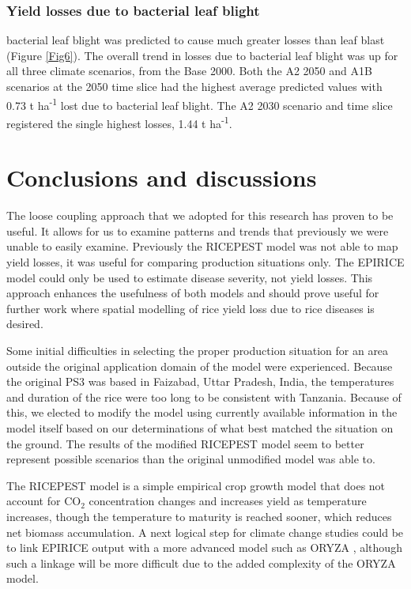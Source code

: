     \subsubsection{Yield losses due to bacterial leaf blight}
    \label{bb_yield_losses}
    bacterial leaf blight was predicted to cause much greater losses than leaf blast (Figure \ref{Fig6}). The overall trend in losses due to bacterial leaf blight was up for all three climate scenarios, from the Base 2000. Both the A2 2050 and A1B scenarios at the 2050 time slice had the highest average predicted values with 0.73 t ha\textsuperscript{-1} lost due to bacterial leaf blight. The A2 2030 scenario and time slice registered the single highest losses, 1.44 t ha\textsuperscript{-1}.
        
    \section{Conclusions and discussions}
    \label{conclusions}
    The loose coupling approach that we adopted for this research has proven to be useful. It allows for us to examine patterns and trends that previously we were unable to easily examine. Previously the RICEPEST model was not able to map yield losses, it was useful for comparing production situations only. The EPIRICE model could only be used to estimate disease severity, not yield losses. This approach enhances the usefulness of both models and should prove useful for further work where spatial modelling of rice yield loss due to rice diseases is desired.
    
    Some initial difficulties in selecting the proper production situation for an area outside the original application domain of the model were experienced. Because the original PS3 was based in Faizabad, Uttar Pradesh, India, the temperatures and duration of the rice were too long to be consistent with Tanzania. Because of this, we elected to modify the model using currently available information in the model itself based on our determinations of what best matched the situation on the ground. The results of the modified RICEPEST model seem to better represent possible scenarios than the original unmodified model was able to.
    
    The RICEPEST model is a simple empirical crop growth model that does not account for CO$_2$ concentration changes and increases yield as temperature increases, though the temperature to maturity is reached sooner, which reduces net biomass accumulation. A next logical step for climate change studies could be to link EPIRICE output with a more advanced model such as ORYZA \citep{Oryza}, although such a linkage will be more difficult due to the added complexity of the ORYZA model.
    
